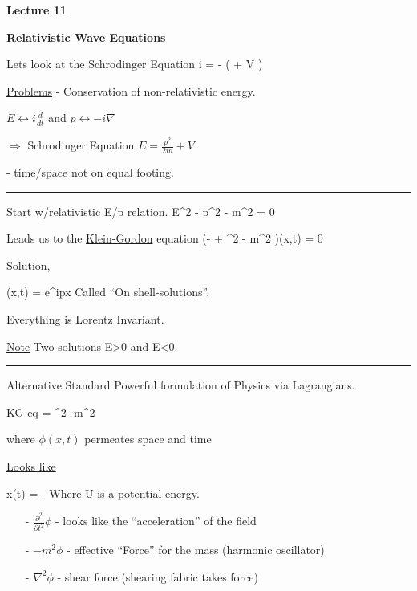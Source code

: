 



\thispagestyle{fancy}

\begin{center}
{\huge \textbf{Lecture 11}}
\end{center}

{\fontsize{14}{16}\selectfont

\textbf{\underline{Relativistic Wave Equations}} 

Lets look at the Schrodinger Equation
\be
i \psi = - \left(  + V \right) \psi
\ee

\underline{Problems} 
- Conservation of non-relativistic energy.


$E \leftrightarrow i \frac{d}{dt}$ 
and
$p \leftrightarrow -i \nabla$


$\Rightarrow$ Schrodinger Equation $E = \frac{p^2}{2m} + V$

- time/space not on equal footing.


\noindent\rule{\textwidth}{1pt}

Start w/relativistic E/p relation.
\be
E^2 - p^2 - m^2 = 0
\ee

Leads us to the \underline{Klein-Gordon} equation
\be
\left(- + \nabla^2 - m^2 \right)\phi(x,t) = 0
\ee


Solution, 

\be
\phi(x,t) = e^{ipx}
\ee
Called ``On shell-solutions''.

Everything is Lorentz Invariant. 

\underline{Note} Two solutions E>0 and E<0.

\noindent\rule{\textwidth}{1pt}

Alternative Standard Powerful formulation of Physics via Lagrangians.

KG eq
\be
{}\phi  =  \nabla^2\phi - m^2 \phi
\ee

where $\phi(x,t)$ permeates space and time

\underline{Looks like}

\be
{}x(t)  =  -
\ee
Where U is a potential energy.

\begin{itemize}
\item[-] $\frac{\partial^2}{\partial t^2}\phi$ - looks like the ``acceleration'' of the field
\item[-] $- m^2 \phi$ - effective ``Force'' for the mass (harmonic oscillator)
\item[-] $\nabla^2\phi$ - shear force (shearing fabric takes force)
\end{itemize}

}
